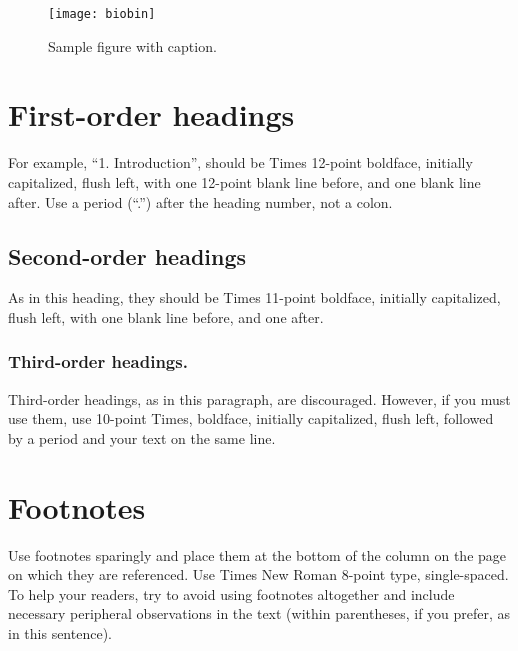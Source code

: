 \documentclass[10pt]{article}
\begin{document}
\begin{figure}[thb]
    \centering
	\texttt{[image: biobin]}
	\caption{Sample figure with caption.}
	\label{fig: sample-figure}       %
\end{figure}

\section{First-order headings}

For example, “1. Introduction”, should be Times 12-point boldface, initially capitalized, flush left, with one 12-point blank line before, and one blank line after. Use a period (“.”) after the heading number, not a colon. 

\subsection{Second-order headings}
 
As in this heading, they should be Times 11-point boldface, initially capitalized, flush left, with one blank line before, and one after. 

\subsubsection{Third-order headings. }

Third-order headings, as in this paragraph, are discouraged. However, if you must use them, use 10-point Times, boldface, initially capitalized, flush left, followed by a period and your text on the same line. 

\section{Footnotes}

      Use footnotes sparingly and place them at the bottom of the column on the page on which they are referenced. Use Times New Roman 8-point type, single-spaced. To help your readers, try to avoid using footnotes altogether and include necessary peripheral observations in the text (within parentheses, if you prefer, as in this sentence). 

\end{document}

